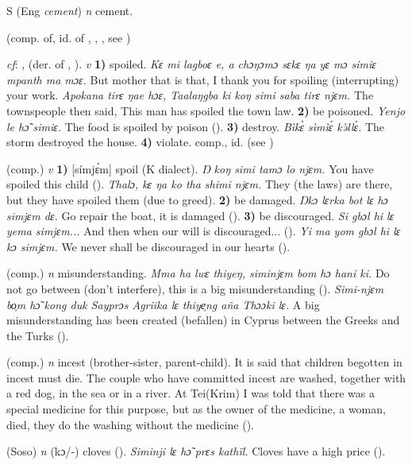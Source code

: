 \begin{letter}{S}
 (Eng \textit{cement}) \textit{n} cement.

 (comp. of, id. of , , , see ) 

 \textit{cf}: ,  (der. of , ). \textit{v} \textbf{1)} spoiled. \textit{Kɛ mi lagboɛ e, a chɔŋɔmɔ sɛkɛ ŋa yɛ mɔ simiɛ mpanth ma mɔɛ.} But mother that is that, I thank you for spoiling (interrupting) your work. \textit{Apokana tirɛ ŋae hɔɛ, Taalaŋgba ki koŋ simi saba tirɛ njɛm.} The townspeople then said, This man has spoiled the town law. \textbf{2)} be poisoned. \textit{Yenjo le hɔ̃ simiɛ.} The food is spoiled by poison (\citealt{Pichl1967}). \textbf{3)} destroy. \textit{Bìkɛ̀ sìmìɛ́ kə̀llɛ̀.} The storm destroyed the house. \textbf{4)} violate. comp., id.  (see )

 (comp.) \textit{v} \textbf{1)} [símjɛ́m] spoil (K dialect). \textit{Ŋ koŋ simi tamɔ lo njɛm.} You have spoiled this child (\citealt{Pichl1967}). \textit{Thalɔ, kɛ ŋa ko tha shimi njɛm.} They (the laws) are there, but they have spoiled them (due to greed). \textbf{2)} be damaged. \textit{Ŋkɔ lɛrka bot lɛ hɔ simjɛm dɛ.} Go repair the boat, it is damaged (\citealt{Pichl1967}). \textbf{3)} be discouraged. \textit{Si gbɔl hi lɛ yema simjɛm...} And then when our will is discouraged... (\citealt{Pichl1967}). \textit{Yi ma yom gbɔl hi lɛ kɔ simjɛm.} We never shall be discouraged in our hearts (\citealt{Pichl1967}). 

 (comp.) \textit{n} misunderstanding. \textit{Mma ha lwɛ thiyeŋ, siminjɛm bom hɔ hani ki.} Do not go between (don't interfere), this is a big misunderstanding (\citealt{Pichl1967}). \textit{Simi-njɛm bo̹m hɔ̃ kong duk Sayprɔs Agriika lɛ thiye̹ng aña Thɔɔki lɛ.} A big misunderstanding has been created (befallen) in Cyprus between the Greeks and the Turks (\citealt{Pichl1967}). 

 (comp.) \textit{n} incest (brother-sister, parent-child). It is said that children begotten in incest must die. The couple who have committed incest are washed, together with a red dog, in the sea or in a river. At Tei(Krim) I was told that there was a special medicine for this purpose, but as the owner of the medicine, a woman, died, they do the washing without the medicine (\citealt{Pichl1967}). 

 (Soso) \textit{n} (kɔ/-) cloves (\citealt{Pichl1967}). \textit{Siminji lɛ hɔ̃ prɛs kathïl.} Cloves have a high price (\citealt{Pichl1967}). 


\end{letter}
